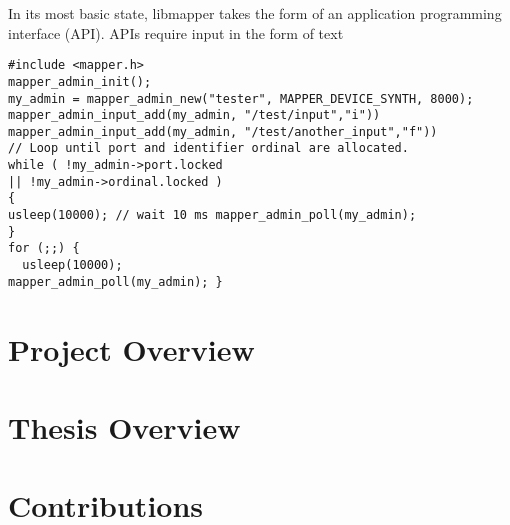 In its most basic state, libmapper takes the form of an application programming interface (API). APIs require input in the form of text

\lstset{language=C}
\begin{lstlisting}
#include <mapper.h>
mapper_admin_init();
my_admin = mapper_admin_new("tester", MAPPER_DEVICE_SYNTH, 8000); 
mapper_admin_input_add(my_admin, "/test/input","i")) 
mapper_admin_input_add(my_admin, "/test/another_input","f"))
// Loop until port and identifier ordinal are allocated. 
while ( !my_admin->port.locked
|| !my_admin->ordinal.locked )
{
usleep(10000); // wait 10 ms mapper_admin_poll(my_admin);
}
for (;;) {
  usleep(10000);
mapper_admin_poll(my_admin); }
\end{lstlisting}



\section{Project Overview}

\section{Thesis Overview}

\section{Contributions}